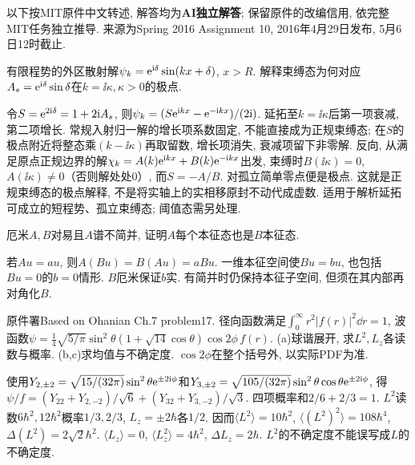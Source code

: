 以下按MIT原件中文转述, 解答均为\textbf{AI独立解答}; 保留原件的改编信用, 依完整MIT任务独立推导. 来源为Spring 2016 Assignment 10, 2016年4月29日发布, 5月6日12时截止.
\begin{exercise}有限程势的外区散射解$\psi_k=\mathrm e^{\mathrm i\delta}\sin(kx+\delta)$, $x>R$. 解释束缚态为何对应$A_s=\mathrm e^{\mathrm i\delta}\sin\delta$在$k=\ii\kappa,\kappa>0$的极点.\end{exercise}
\begin{solution}令$S=\mathrm e^{2\mathrm i\delta}=1+2\mathrm i A_s$, 则$\psi_k=(S\mathrm e^{\mathrm i kx}-\mathrm e^{-\mathrm i kx})/(2\mathrm i)$. 延拓至$k=\ii\kappa$后第一项衰减, 第二项增长. 常规入射归一解的增长项系数固定, 不能直接成为正规束缚态; 在$S$的极点附近将整态乘$(k-\ii\kappa)$再取留数, 增长项消失, 衰减项留下非零解. 反向, 从满足原点正规边界的解$\chi_k=A(k)\mathrm e^{\mathrm i kx}+B(k)\mathrm e^{-\mathrm i kx}$出发, 束缚时$B(\ii\kappa)=0$, $A(\ii\kappa)\ne0$（否则解处处0）, 而$S=-A/B$. 对孤立简单零点便是极点. 这就是正规束缚态的极点解释, 不是将实轴上的实相移原封不动代成虚数. 适用于解析延拓可成立的短程势、孤立束缚态; 阈值态需另处理.\end{solution}
\begin{exercise}厄米$A,B$对易且$A$谱不简并, 证明$A$每个本征态也是$B$本征态.\end{exercise}
\begin{solution}若$Au=au$, 则$A(Bu)=B(Au)=aBu$. 一维本征空间使$Bu=bu$, 也包括$Bu=0$的$b=0$情形. $B$厄米保证$b$实. 有简并时仍保持本征子空间, 但须在其内部再对角化$B$.\end{solution}
\begin{exercise}
原件署Based on Ohanian Ch.7 problem17. 径向函数满足$\int_0^\infty r^2|f(r)|^2\dd r=1$, 波函数$\psi=\tfrac14\sqrt{5/\pi}\sin^2\theta(1+\sqrt{14}\cos\theta)\cos2\phi\,f(r)$. (a)球谐展开, 求$L^2,L_z$各读数与概率. (b,c)求均值与不确定度. $\cos2\phi$在整个括号外, 以实际PDF为准.
\end{exercise}
\begin{solution}
使用$Y_{2,\pm2}=\sqrt{15/(32\pi)}\sin^2\theta\mathrm e^{\pm2\mathrm i\phi}$和$Y_{3,\pm2}=\sqrt{105/(32\pi)}\sin^2\theta\cos\theta\mathrm e^{\pm2\mathrm i\phi}$, 得$\psi/f=(Y_{22}+Y_{2,-2})/\sqrt6+(Y_{32}+Y_{3,-2})/\sqrt3$. 四项概率和$2/6+2/3=1$. $L^2$读数$6\hbar^2,12\hbar^2$概率$1/3,2/3$, $L_z=\pm2\hbar$各$1/2$. 因而$\langle L^2\rangle=10\hbar^2$, $\langle(L^2)^2\rangle=108\hbar^4$, $\Delta(L^2)=2\sqrt2\hbar^2$. $\langle L_z\rangle=0$, $\langle L_z^2\rangle=4\hbar^2$, $\Delta L_z=2\hbar$. $L^2$的不确定度不能误写成$L$的不确定度.
\end{solution}
